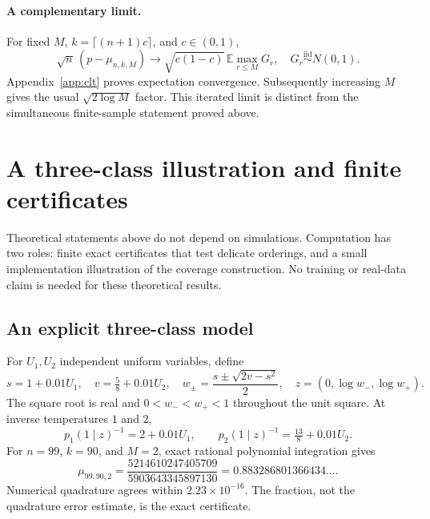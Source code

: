 \documentclass[10pt]{article}
\theoremstyle{definition}\newtheorem{definition}[theorem]{Definition}
\theoremstyle{remark}\newtheorem{remark}[theorem]{Remark}
\newcommand{\E}{\mathbb E}
\newcommand{\1}{\mathbf 1}
\begin{document}
\paragraph{A complementary limit.}
For fixed $M$, $k=\lceil(n+1)c\rceil$, and $c\in(0,1)$,
\begin{equation}\label{eq:iterated}
 \sqrt n\,(p-\mu_{n,k,M})\longrightarrow
 \sqrt{c(1-c)}\,\E\max_{r\le M}G_r,
 \quad G_r\overset{\mathrm{iid}}\sim N(0,1).
\end{equation}
Appendix~\ref{app:clt} proves expectation convergence. Subsequently increasing $M$ gives the usual $\sqrt{2\log M}$ factor. This iterated limit is distinct from the simultaneous finite-sample statement proved above.

\section{A three-class illustration and finite certificates}\label{sec:evidence}
Theoretical statements above do not depend on simulations. Computation has two roles: finite exact certificates that test delicate orderings, and a small implementation illustration of the coverage construction. No training or real-data claim is needed for these theoretical results.

\subsection{An explicit three-class model}
For $U_1,U_2$ independent uniform variables, define
\begin{equation}\label{eq:explicit}
 s=1+0.01U_1,\quad v=\tfrac58+0.01U_2,\quad
 w_\pm=\frac{s\pm\sqrt{2v-s^2}}2,\quad z=(0,\log w_-,\log w_+).
\end{equation}
The square root is real and $0<w_-<w_+<1$ throughout the unit square. At inverse temperatures $1$ and $2$,
\begin{equation}
 p_1(1\mid z)^{-1}=2+0.01U_1,
 \qquad p_2(1\mid z)^{-1}=\tfrac{13}{8}+0.01U_2.
\end{equation}
For $n=99$, $k=90$, and $M=2$, exact rational polynomial integration gives
\begin{equation}\label{eq:exactnumber}
 \mu_{99,90,2}=\frac{5214610247405709}{5903643345897130}
 =0.883286801366434\ldots.
\end{equation}
Numerical quadrature agrees within $2.23\times10^{-16}$. The fraction, not the quadrature error estimate, is the exact certificate.
\end{document}
